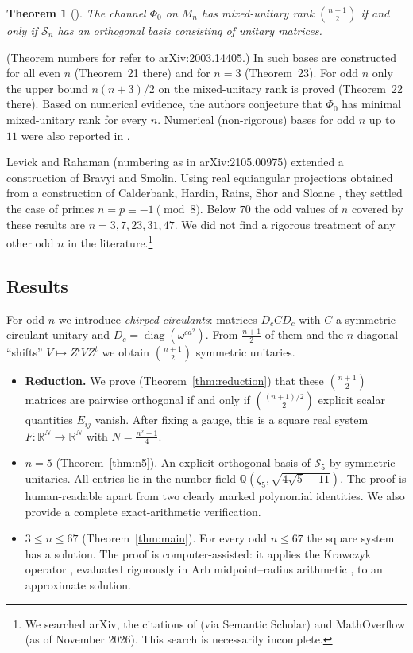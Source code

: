 \documentclass[11pt]{amsart}
\newtheorem{theorem}{Theorem}
\theoremstyle{definition}
\theoremstyle{remark}
\newcommand{\R}{\mathbb{R}}
\newcommand{\Q}{\mathbb{Q}}
\newcommand{\Sym}{\mathcal{S}}
\begin{document}
\begin{theorem}[{\cite[Theorem~19]{GLL22}}]\label{thm:GLL}
The channel $\Phi_0$ on $M_n$ has mixed-unitary rank $\binom{n+1}{2}$ if and only if $\Sym_n$ has an orthogonal basis consisting of unitary matrices.
\end{theorem}

(Theorem numbers for \cite{GLL22} refer to arXiv:2003.14405.) In \cite{GLL22} such bases are constructed for all even $n$ (Theorem~21 there) and for $n=3$ (Theorem~23). For odd $n$ only the upper bound $n(n+3)/2$ on the mixed-unitary rank is proved (Theorem~22 there). Based on numerical evidence, the authors conjecture that $\Phi_0$ has minimal mixed-unitary rank for every $n$. Numerical (non-rigorous) bases for odd $n$ up to $11$ were also reported in \cite{MO316985}.

Levick and Rahaman \cite[Theorem~3.8, Corollary~3.12]{LR21} (numbering as in arXiv:2105.00975) extended a construction of Bravyi and Smolin. Using real equiangular projections obtained from a construction of Calderbank, Hardin, Rains, Shor and Sloane \cite{CHRSS99}, they settled the case of primes $n=p\equiv -1\pmod 8$. Below $70$ the odd values of $n$ covered by these results are $n=3,7,23,31,47$. We did not find a rigorous treatment of any other odd $n$ in the literature.\footnote{We searched arXiv, the citations of \cite{GLL22} (via Semantic Scholar) and MathOverflow (as of November 2026). This search is necessarily incomplete.}

\subsection*{Results}
For odd $n$ we introduce \emph{chirped circulants}: matrices $D_cCD_c$ with $C$ a symmetric circulant unitary and $D_c=\operatorname{diag}(\omega^{ca^2})$. From $\frac{n+1}{2}$ of them and the $n$ diagonal ``shifts'' $V\mapsto Z^tVZ^t$ we obtain $\binom{n+1}{2}$ symmetric unitaries.

\begin{itemize}
\item \textbf{Reduction.} We prove (Theorem~\ref{thm:reduction}) that these $\binom{n+1}{2}$ matrices are pairwise orthogonal if and only if $\binom{(n+1)/2}{2}$ explicit scalar quantities $E_{ij}$ vanish. After fixing a gauge, this is a square real system $F:\R^N\to\R^N$ with $N=\frac{n^2-1}{4}$.
\item \textbf{$n=5$} (Theorem~\ref{thm:n5}). An explicit orthogonal basis of $\Sym_5$ by symmetric unitaries. All entries lie in the number field $\Q(\zeta_5,\sqrt{4\sqrt5-11})$. The proof is human-readable apart from two clearly marked polynomial identities. We also provide a complete exact-arithmetic verification.
\item \textbf{$3\le n\le 67$} (Theorem~\ref{thm:main}). For every odd $n\le 67$ the square system has a solution. The proof is computer-assisted: it applies the Krawczyk operator \cite{Kra69,Moo77,Rum10}, evaluated rigorously in Arb midpoint--radius arithmetic \cite{Joh17}, to an approximate solution.
\end{itemize}
\end{document}
